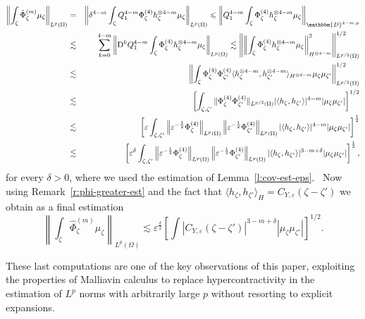\documentclass[a4paper,11pt]{article}
\newcommand{\mathD}{\mathrm{D}}
\begin{document}
\begin{eqnarray*}
  \left\| \int_{\zeta} \hat{\Phi}^{(m)}_{\zeta} \mu_{\zeta} \right\|_{L^p
  (\Omega)} & = & \left\| \delta^{4 - m} \int_{\zeta} Q_1^{4 - m}
  \Phi^{(4)}_{\zeta} h^{\otimes 4 - m}_{\zeta} \mu_{\zeta} \right\|_{L^p
  (\Omega)} \leqslant \left\| Q_1^{4 - m} \int_{\zeta} \Phi^{(4)}_{\zeta}
  h^{\otimes 4 - m}_{\zeta} \mu_{\zeta} \right\|_{\mathbbm{D}^{4 - m, p}}\\
  & \lesssim & \sum_{k = 0}^{4 - m} \left\| \mathD^k Q_1^{4 - m} \int_{\zeta}
  \Phi^{(4)}_{\zeta} h^{\otimes 4 - m}_{\zeta} \mu_{\zeta} \right\|_{L^p
  (\Omega)} \lesssim \left\| \left\| \int_{\zeta} \Phi_{\zeta}^{(4)}
  h_{\zeta}^{\otimes 4 - m} \mu_{\zeta} \right\|^2_{H^{\otimes 4 - m}}
  \right\|_{L^{p / 2} (\Omega)}^{1 / 2}\\
  & \lesssim & \left\| \int_{\zeta} \Phi_{\zeta}^{(4)} \Phi_{\zeta'}^{(4)}
  \langle h_{\zeta}^{\otimes 4 - m}, h_{\zeta'}^{\otimes 4 - m}
  \rangle_{H^{\otimes 4 - m}} \mu_{\zeta} \mu_{\zeta'}  \right\|_{L^{p / 2}
  (\Omega)}^{1 / 2}\\
  & \lesssim & \left[ \int_{\zeta, \zeta'} \| \Phi_{\zeta}^{(4)}
  \Phi_{\zeta'}^{(4)} \|_{L^{p / 2} (\Omega)}  | \langle h_{\zeta}, h_{\zeta'}
  \rangle |^{4 - m}  | \mu_{\zeta} \mu_{\zeta'} | \right]^{1 / 2}\\
  & \lesssim & \left[ \varepsilon \int_{\zeta, \zeta'} \left\| \varepsilon^{-
  \frac{1}{2}} \Phi^{(4)}_{\zeta} \right\|_{L^p (\Omega)} \left\|
  \varepsilon^{- \frac{1}{2}} \Phi^{(4)}_{\zeta'} \right\|_{L^p (\Omega)} |
  \langle h_{\zeta}, h_{\zeta'} \rangle |^{4 - m} | \mu_{\zeta} \mu_{\zeta'} |
  \right]^{\frac{1}{2}}\\
  & \lesssim & \left[ \varepsilon^{\delta} \int_{\zeta, \zeta'} \left\|
  \varepsilon^{- \frac{1}{2}} \Phi^{(4)}_{\zeta} \right\|_{L^p (\Omega)}
  \left\| \varepsilon^{- \frac{1}{2}} \Phi^{(4)}_{\zeta'} \right\|_{L^p
  (\Omega)} | \langle h_{\zeta}, h_{\zeta'} \rangle |^{3 - m + \delta} |
  \mu_{\zeta} \mu_{\zeta'} | \right]^{\frac{1}{2}},
\end{eqnarray*}
for every $\delta > 0$, where we used the estimation of
Lemma~\ref{l:cov-est-eps}. \ Now using Remark~\ref{r:phi-greater-est} and the
fact that $\langle h_{\zeta}, h_{\zeta'} \rangle_H = C_{Y, \varepsilon} (\zeta
- \zeta')$ we obtain as a final estimation
\begin{equation}
  \left\| \int_{\zeta} \hat{\Phi}^{(m)}_{\zeta} \mu_{\zeta} \right\|_{L^p
  (\Omega)} \lesssim \varepsilon^{\frac{\delta}{2}} \left[ \int | C_{Y,
  \varepsilon} (\zeta - \zeta') |^{3 - m + \delta}  | \mu_{\zeta} \mu_{\zeta'}
  | \right]^{1 / 2} . \label{e:firstorder-last-estim}
\end{equation}
\begin{remark}
  These last computations are one of the key observations of this paper,
  exploiting the properties of Malliavin calculus to replace
  hypercontractivity in the estimation of $L^p$ norms with arbitrarily large
  $p$ without resorting to explicit expansions.
\end{remark}
\end{document}
